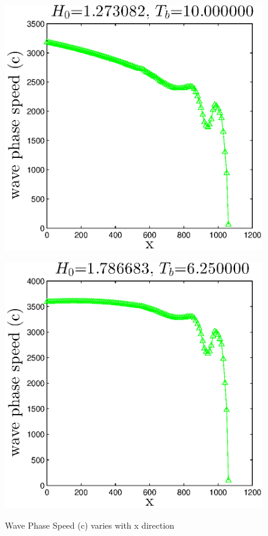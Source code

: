 
\begin{figure}[h]
\begin{minipage}[b]{0.47\linewidth}
\centering
\includegraphics[width=\textwidth]{forward_plot/p1_4.eps}
\label{Figc_1}
\end{minipage}
\hspace{0.2cm}
\begin{minipage}[b]{0.47\linewidth}
\centering
\includegraphics[width=\textwidth]{forward_plot/p2_4.eps}
\label{Figc_2}
\end{minipage}
\caption{Wave Phase Speed (c) varies with x direction}
\end{figure}

